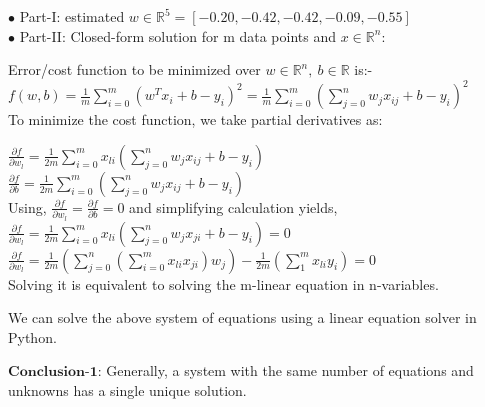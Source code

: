 \documentclass{article}%
\begin{document}
$\bullet$ Part-I: estimated $w\in\mathbb{R}^5 = [-0.20, -0.42, -0.42, -0.09, -0.55]$\\

$\bullet$ Part-II: Closed-form solution for m data points and $x\in \mathbb{R}^n$:

Error/cost function to be minimized over $w\in\mathbb{R}^n,\ b\in\mathbb{R}$ is:-\\

$f(w,b)=\frac{1}{m}\sum_{i=0}^{m} (w^Tx_i+b-y_i)^2 = \frac{1}{m}\sum_{i=0}^{m} (\sum_{j=0}^{n} w_j x_{ij}+b-y_i)^2$\\

To minimize the cost function, we take partial derivatives as:

$\frac{\partial f}{\partial w_l}= \frac{1}{2m}\sum_{i=0}^{m}x_{li} (\sum_{j=0}^{n} w_j x_{ij}+b-y_i)$\\

$\frac{\partial f}{\partial b}= \frac{1}{2m}\sum_{i=0}^{m} (\sum_{j=0}^{n} w_j x_{ij}+b-y_i)$\\

Using, $\frac{\partial f}{\partial w_l}= \frac{\partial f}{\partial b}=0$ and simplifying calculation yields,\\

$\frac{\partial f}{\partial w_l}= \frac{1}{2m}\sum_{i=0}^{m}x_{li} (\sum_{j=0}^{n} w_j x_{ji}+b-y_i)=0$\\

$\frac{\partial f}{\partial w_l}= \frac{1}{2m}(\sum_{j=0}^{n}(\sum_{i=0}^{m}x_{li}x_{ji})w_j)-\frac{1}{2m}(\sum_{1}^{m}x_{li}y_i)=0$\\

Solving it is equivalent to solving the m-linear equation in n-variables.\\ 

 \par


We can solve the above system of equations using a linear equation solver in Python.\\

 \par

$\textbf{Conclusion-1}$: Generally, a system with the same number of equations and unknowns has a single unique solution.\\
\end{document}
